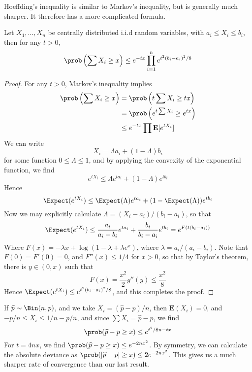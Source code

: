 Hoeffding's inequality is similar to Markov's inequality, but is generally much sharper. It therefore has a more complicated formula.

\begin{theorem}
    Let $X_1, \dots, X_n$ be centrally distributed i.i.d random variables, with $a_i \leq X_i \leq b_i$, then for any $t > 0$,
    \[ \prob \left( \sum X_i \geq x \right) \leq e^{-tx} \prod_{i = 1}^n e^{t^2 (b_i - a_i)^2/8} \]
\end{theorem}
\begin{proof}
    For any $t > 0$, Markov's inequality implies
    \begin{align*}
        \prob \left( \sum X_i \geq x \right) &= \prob \left( t \sum X_i \geq tx \right)\\
        &= \prob \left( e^{t \sum X_i} \geq e^{tx} \right)\\
        &\leq e^{-tx} \prod \mathbf{E}[e^{t X_i}]
    \end{align*}
    We can write
    \[ X_i = \Lambda a_i + (1 - \Lambda) b_i \]
    for some function $0 \leq \Lambda \leq 1$, and by applying the convexity of the exponential function, we find
    \[ e^{tX_i} \leq \Lambda e^{t a_i} + (1 - \Lambda) e^{t b_i} \]
    Hence
    \[ \Expect(e^{tX_i}) \leq \Expect(\Lambda) e^{t a_i} + (1 - \Expect(\Lambda)) e^{t b_i} \]
    Now we may explicitly calculate $\Lambda = (X_i - a_i)/(b_i - a_i)$, so that
    \[ \Expect(e^{tX_i}) \leq \frac{a_i}{a_i - b_i} e^{t a_i} + \frac{b_i}{b_i - a_i} e^{t b_i} = e^{F(t(b_i - a_i))} \]
    Where $F(x) = - \lambda x + \log(1 - \lambda + \lambda e^x)$, where $\lambda = a_i/(a_i - b_i)$. Note that $F(0) = F'(0) = 0$, and $F''(x) \leq 1/4$ for $x > 0$, so that by Taylor's theorem, there is $y \in (0,x)$ such that
    \[ F(x) = \frac{x^2}{2} g''(y) \leq \frac{x^2}{8} \]
    Hence $\Expect(e^{tX_i}) \leq e^{t^2(b_i - a_i)^2/8}$, and this completes the proof.
\end{proof}

\begin{example}
    If $\widehat{p} \sim \Bin(n,p)$, and we take $X_i = (\widehat{p} - p)/n$, then $\mathbf{E}(X_i) = 0$, and $-p/n \leq X_i \leq 1/n-p/n$, and since $\sum X_i = \widehat{p} - p$, we find
    \[ \prob(\widehat{p} - p \geq x) \leq e^{t^2/8n - tx} \]
    For $t = 4nx$, we find $\prob(\widehat{p} - p \geq x) \leq e^{-2nx^2}$. By symmetry, we can calculate the absolute deviance as $\prob(|\widehat{p} - p| \geq x) \leq 2e^{-2nx^2}$. This gives us a much sharper rate of convergence than our last result.
\end{example}

